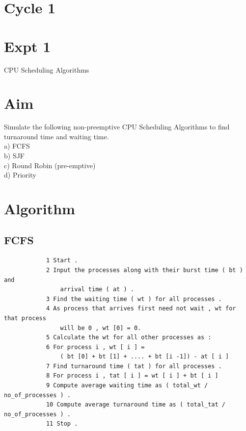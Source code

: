 \documentclass[13pt,oneside]{book}
\begin{document}
\section*{Cycle 1}
\section*{Expt 1}
\begin{center}
    \Large{CPU Scheduling Algorithms}
\end{center}

\section*{Aim}
\large{
Simulate the following non-preemptive CPU Scheduling
Algorithms to find turnaround time and waiting time.\\
a) FCFS\\
b) SJF\\
c) Round Robin (pre-emptive)\\
d) Priority\\
}

\section*{Algorithm}
    \subsection*{FCFS}
	    \begin{verbatim}
	        1 Start .
            2 Input the processes along with their burst time ( bt ) and
                arrival time ( at ) .
            3 Find the waiting time ( wt ) for all processes .
            4 As process that arrives first need not wait , wt for that process
                will be 0 , wt [0] = 0.
            5 Calculate the wt for all other processes as :
            6 For process i , wt [ i ] = 
                ( bt [0] + bt [1] + .... + bt [i -1]) - at [ i ]
            7 Find turnaround time ( tat ) for all processes .
            8 For process i , tat [ i ] = wt [ i ] + bt [ i ]
            9 Compute average waiting time as ( total_wt / no_of_processes ) .
            10 Compute average turnaround time as ( total_tat / no_of_processes ) .
            11 Stop .
	   \end{verbatim}  
\end{document}
